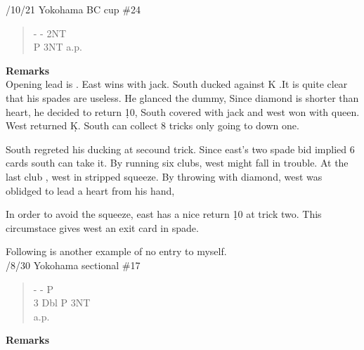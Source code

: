 /10/21 Yokohama BC cup \#24
\begin{quote}
%
  {}%
  {}
  {}%
  {}%
\end{quote}
\begin{quote}
\begin{bidding}
- \> -  \s \> 2NT \\
P \> 3NT \>a.p.
\end{bidding}
\end{quote}
{\bf Remarks}\\

Opening lead is . East wins with jack. South ducked against 
\s K .It is quite clear that his spades are useless. He glanced the 
dummy, Since diamond is shorter than heart, he decided to return
\d 10, South covered with jack and west won with queen. West returned \d K.
South can collect 8 tricks only going to down one.

South regreted his ducking at secound trick. Since east's two spade bid 
implied 6 cards south can take it. 
By running six clubs, west might fall in trouble.
At the last club , west in stripped squeeze. By throwing with diamond, west was
oblidged to lead a heart from his hand,

In order to avoid the squeeze, east has a nice return \d 10 at trick two.
This circumstace gives west an exit card in spade.

\vspace{0.5cm}
Following is another example of no entry to myself.\\


/8/30 Yokohama sectional \#17
\begin{quote}
%
  {}%
  {}
  {}%
  {}%
\end{quote}
\begin{quote}
\begin{bidding}
- \> -  \s \> P  \\
3\s \> Dbl \> P \> 3NT\\
a.p.
\end{bidding}
\end{quote}
{\bf Remarks}\\

